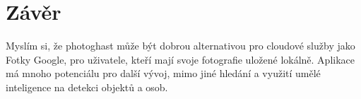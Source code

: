 \documentclass[czech]{template/pyt-report}
\begin{document}
\section{Závěr}
Myslím si, že photoghast může být dobrou alternativou pro cloudové služby jako Fotky Google,
pro uživatele, kteří mají svoje fotografie uložené lokálně. Aplikace má mnoho potenciálu
pro další vývoj, mimo jiné hledání a využití umělé inteligence na detekci objektů a osob.
% 
% 
\end{document}
